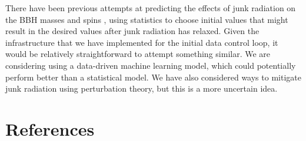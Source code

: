 \documentclass{../document}
\begin{document}
  There have been previous attempts at predicting the effects of junk radiation on the BBH masses and spins \cite{JunkRadiation}, using statistics to choose initial values that might result in the desired values after junk radiation has relaxed. Given the infrastructure that we have implemented for the initial data control loop, it would be relatively straightforward to attempt something similar. We are considering using a data-driven machine learning model, which could potentially perform better than a statistical model. We have also considered ways to mitigate junk radiation using perturbation theory, but this is a more uncertain idea.

	\section*{References}

	\printbibliography[heading=none]
\end{document}
